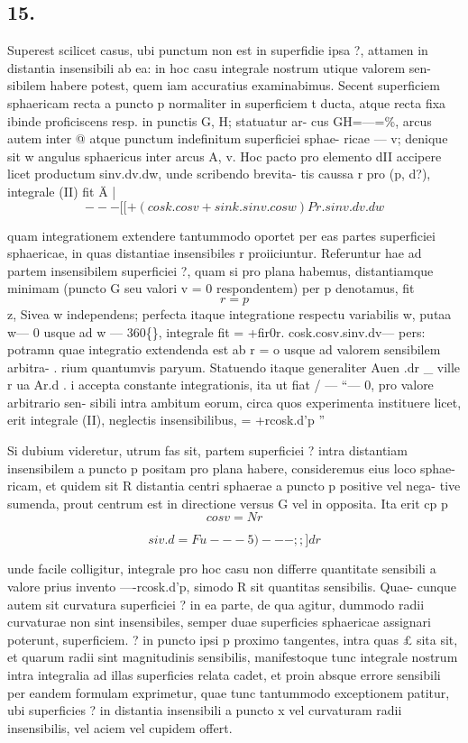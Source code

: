 \documentclass[12pt,a4paper]{article}
\begin{document}
\subsection*{15.}

Superest scilicet casus, ubi punctum        non est in superfidie ipsa ?, attamen
in distantia insensibili ab ea: in hoc casu integrale nostrum utique valorem sen-
sibilem habere potest, quem iam accuratius examinabimus.
Secent superficiem sphaericam recta a puncto p normaliter in superficiem
t ducta, atque recta fixa ibinde proficiscens resp. in punctis G, H; statuatur ar-
cus GH=---=\%, arcus autem inter @ atque punctum indefinitum superficiei sphae-
ricae --- v; denique sit w angulus sphaericus inter arcus A, v. Hoc pacto pro
elemento dII accipere licet productum sinv.dv.dw, unde scribendo brevita-
tis caussa r pro (p, d?), integrale (II) fit                     Ä                |
\[                 --- [[+(cosk.cosv+sink.sinv.cosw)Pr.sinv.dv.dw\]

quam integrationem extendere tantummodo oportet per eas partes superficiei
sphaericae, in quas distantiae insensibiles r proiiciuntur. Referuntur
hae ad
partem insensibilem superficiei ?, quam si pro plana habemus, distantiamque
minimam       (puncto   G seu valori v = 0 respondentem) per p denotamus, fit
\[ r=    p\]
z,       Sivea w independens; perfecta itaque integratione respectu variabilis
w, putaa w---         0 usque ad w --- 360\textdegree\{\}, integrale fit
= +fir0r. cosk.cosv.sinv.dv--- pers: potramn
quae integratio extendenda est ab r = o usque ad valorem sensibilem arbitra-
. rium quantumvis paryum. Statuendo itaque generaliter
Auen
.dr \_        ville
r        ua                   Ar.d                        .   i
accepta constante integrationis, ita ut fiat / --- ``--- 0, pro valore arbitrario sen-
sibili intra ambitum eorum, circa quos experimenta instituere licet, erit integrale
(II), neglectis insensibilibus,
= +rcosk.d'p
''


Si dubium videretur, utrum fas sit, partem superficiei ? intra distantiam
insensibilem a puncto p positam pro plana habere, consideremus eius loco sphae-
ricam, et quidem sit R distantia centri sphaerae a puncto p positive vel nega-
tive sumenda, prout centrum est in directione versus G vel in opposita. Ita erit
cp p
\[                               cosv   = Nr\]


\[                         siv.d= Fu---5)---;;]dr\]

unde facile colligitur, integrale pro hoc casu non differre quantitate sensibili a
valore prius invento    ----rcosk.d'p,     simodo     R sit quantitas sensibilis.   Quae-
cunque autem sit curvatura superficiei ? in ea parte, de qua agitur, dummodo
radii curvaturae non sint insensibiles, semper duae superficies sphaericae assignari
poterunt, superficiem. ? in puncto ipsi p proximo tangentes, intra quas £ sita
sit, et quarum radii sint magnitudinis sensibilis, manifestoque tunc integrale
nostrum intra integralia ad illas superficies relata cadet, et proin absque errore
sensibili per eandem formulam exprimetur, quae tunc tantummodo exceptionem
patitur, ubi superficies ? in distantia insensibili a puncto x vel curvaturam radii
insensibilis, vel aciem vel cupidem offert.
\end{document}

